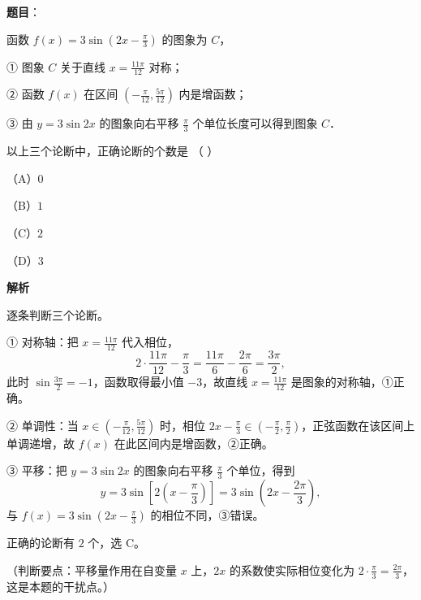 \begin{answer}

\textbf{题目}：

函数 $f(x)=3\sin\left(2x-\frac{\pi}{3}\right)$ 的图象为 $C$，

① 图象 $C$ 关于直线 $x=\frac{11\pi}{12}$ 对称；

② 函数 $f(x)$ 在区间 $\left(-\frac{\pi}{12},\frac{5\pi}{12}\right)$ 内是增函数；

③ 由 $y=3\sin2x$ 的图象向右平移 $\frac{\pi}{3}$ 个单位长度可以得到图象 $C$．

以上三个论断中，正确论断的个数是 （ ）

（A）$0$

（B）$1$

（C）$2$

（D）$3$

\textbf{解析}

逐条判断三个论断。

① 对称轴：把 $x=\frac{11\pi}{12}$ 代入相位，
\nopagebreak[4]
\[2\cdot\frac{11\pi}{12}-\frac{\pi}{3}=\frac{11\pi}{6}-\frac{2\pi}{6}=\frac{3\pi}{2},\]
此时 $\sin\frac{3\pi}{2}=-1$，函数取得最小值 $-3$，故直线 $x=\frac{11\pi}{12}$ 是图象的对称轴，①正确。

② 单调性：当 $x\in\left(-\frac{\pi}{12},\frac{5\pi}{12}\right)$ 时，相位 $2x-\frac{\pi}{3}\in\left(-\frac{\pi}{2},\frac{\pi}{2}\right)$，正弦函数在该区间上单调递增，故 $f(x)$ 在此区间内是增函数，②正确。

③ 平移：把 $y=3\sin2x$ 的图象向右平移 $\frac{\pi}{3}$ 个单位，得到
\nopagebreak[4]
\[y=3\sin\left[2\left(x-\frac{\pi}{3}\right)\right]=3\sin\left(2x-\frac{2\pi}{3}\right),\]
与 $f(x)=3\sin\left(2x-\frac{\pi}{3}\right)$ 的相位不同，③错误。

正确的论断有 $2$ 个，选 C。

（判断要点：平移量作用在自变量 $x$ 上，$2x$ 的系数使实际相位变化为 $2\cdot\frac{\pi}{3}=\frac{2\pi}{3}$，这是本题的干扰点。）


\end{answer}
